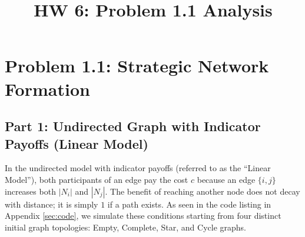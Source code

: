\documentclass{article}
\title{HW 6: Problem 1.1 Analysis}
\author{}
\date{}
\begin{document}
\maketitle

\section*{Problem 1.1: Strategic Network Formation}

\subsection*{Part 1: Undirected Graph with Indicator Payoffs (Linear Model)}
In the undirected model with indicator payoffs (referred to as the ``Linear Model''), both participants of an edge pay the cost $c$ because an edge $\{i,j\}$ increases both $|N_i|$ and $|N_j|$. The benefit of reaching another node does not decay with distance; it is simply $1$ if a path exists. As seen in the code listing in Appendix \ref{sec:code}, we simulate these conditions starting from four distinct initial graph topologies: Empty, Complete, Star, and Cycle graphs.
\end{document}
